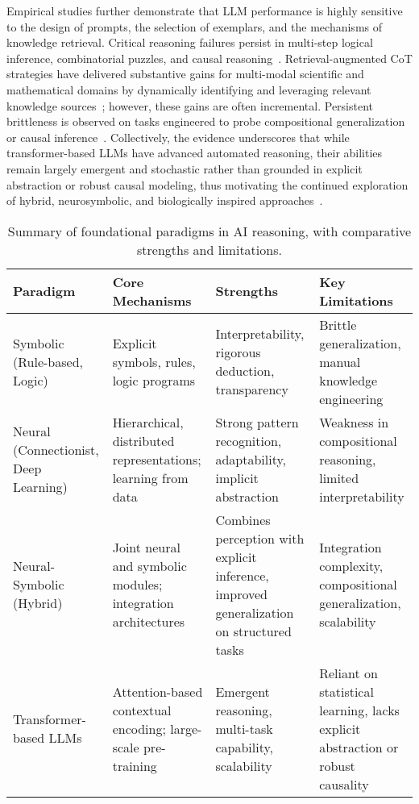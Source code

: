 \documentclass[11pt]{article}
\begin{document}
Empirical studies further demonstrate that LLM performance is highly sensitive to the design of prompts, the selection of exemplars, and the mechanisms of knowledge retrieval. Critical reasoning failures persist in multi-step logical inference, combinatorial puzzles, and causal reasoning~\cite{ref1,ref10,ref19}. Retrieval-augmented CoT strategies have delivered substantive gains for multi-modal scientific and mathematical domains by dynamically identifying and leveraging relevant knowledge sources~\cite{ref11,ref42}; however, these gains are often incremental. Persistent brittleness is observed on tasks engineered to probe compositional generalization or causal inference~\cite{ref43,ref44,ref70,ref86}. Collectively, the evidence underscores that while transformer-based LLMs have advanced automated reasoning, their abilities remain largely emergent and stochastic rather than grounded in explicit abstraction or robust causal modeling, thus motivating the continued exploration of hybrid, neurosymbolic, and biologically inspired approaches~\cite{ref42,ref49,ref86}.

\begin{table}[ht]
\centering
\begin{tabular}{|p{3cm}|p{4cm}|p{3.5cm}|p{3.5cm}|}
\hline
\textbf{Paradigm} & \textbf{Core Mechanisms} & \textbf{Strengths} & \textbf{Key Limitations} \\
\hline
Symbolic (Rule-based, Logic) & Explicit symbols, rules, logic programs & Interpretability, rigorous deduction, transparency & Brittle generalization, manual knowledge engineering \\
\hline
Neural (Connectionist, Deep Learning) & Hierarchical, distributed representations; learning from data & Strong pattern recognition, adaptability, implicit abstraction & Weakness in compositional reasoning, limited interpretability \\
\hline
Neural-Symbolic (Hybrid) & Joint neural and symbolic modules; integration architectures & Combines perception with explicit inference, improved generalization on structured tasks & Integration complexity, compositional generalization, scalability \\
\hline
Transformer-based LLMs & Attention-based contextual encoding; large-scale pre-training & Emergent reasoning, multi-task capability, scalability & Reliant on statistical learning, lacks explicit abstraction or robust causality \\
\hline
\end{tabular}
\caption{Summary of foundational paradigms in AI reasoning, with comparative strengths and limitations.}
\label{tab:paradigm_comparison}
\end{table}
\end{document}
